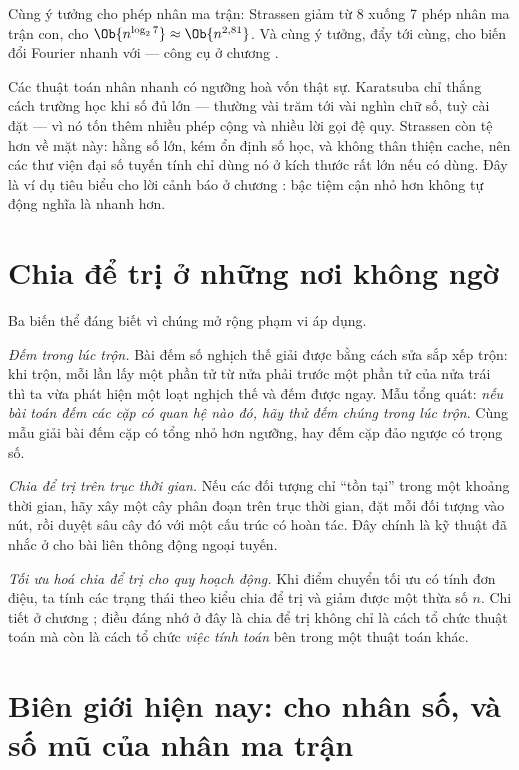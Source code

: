 \documentclass[../../algorithm.tex]{subfiles}
\begin{document}
Cùng ý tưởng cho phép nhân ma trận: Strassen\cite{strassen1969} giảm từ 8 xuống 7 phép nhân ma trận con, cho \(\Ob{n^{\log_2 7}} \approx \Ob{n^{2,81}}\). Và cùng ý tưởng, đẩy tới cùng, cho biến đổi Fourier nhanh với  --- công cụ ở chương .

\begin{cambay}
Các thuật toán nhân nhanh có ngưỡng hoà vốn thật sự. Karatsuba chỉ thắng cách trường học khi số đủ lớn --- thường vài trăm tới vài nghìn chữ số, tuỳ cài đặt --- vì nó tốn thêm nhiều phép cộng và nhiều lời gọi đệ quy. Strassen còn tệ hơn về mặt này: hằng số lớn, kém ổn định số học, và không thân thiện cache, nên các thư viện đại số tuyến tính chỉ dùng nó ở kích thước rất lớn nếu có dùng. Đây là ví dụ tiêu biểu cho lời cảnh báo ở chương : bậc tiệm cận nhỏ hơn không tự động nghĩa là nhanh hơn.
\end{cambay}

\section{Chia để trị ở những nơi không ngờ}

Ba biến thể đáng biết vì chúng mở rộng phạm vi áp dụng.

\emph{Đếm trong lúc trộn.} Bài đếm số nghịch thế giải được bằng cách sửa sắp xếp trộn: khi trộn, mỗi lần lấy một phần tử từ nửa phải trước một phần tử của nửa trái thì ta vừa phát hiện một loạt nghịch thế và đếm được ngay. Mẫu tổng quát: \emph{nếu bài toán đếm các cặp có quan hệ nào đó, hãy thử đếm chúng trong lúc trộn}. Cùng mẫu giải bài đếm cặp có tổng nhỏ hơn ngưỡng, hay đếm cặp đảo ngược có trọng số.

\emph{Chia để trị trên trục thời gian.} Nếu các đối tượng chỉ ``tồn tại'' trong một khoảng thời gian, hãy xây một cây phân đoạn trên trục thời gian, đặt mỗi đối tượng vào  nút, rồi duyệt sâu cây đó với một cấu trúc có hoàn tác. Đây chính là kỹ thuật đã nhắc ở  cho bài liên thông động ngoại tuyến.

\emph{Tối ưu hoá chia để trị cho quy hoạch động.} Khi điểm chuyển tối ưu có tính đơn điệu, ta tính các trạng thái theo kiểu chia để trị và giảm được một thừa số \(n\). Chi tiết ở chương ; điều đáng nhớ ở đây là chia để trị không chỉ là cách tổ chức thuật toán mà còn là cách tổ chức \emph{việc tính toán} bên trong một thuật toán khác.

\section{Biên giới hiện nay:  cho nhân số, và số mũ của nhân ma trận}
\end{document}
